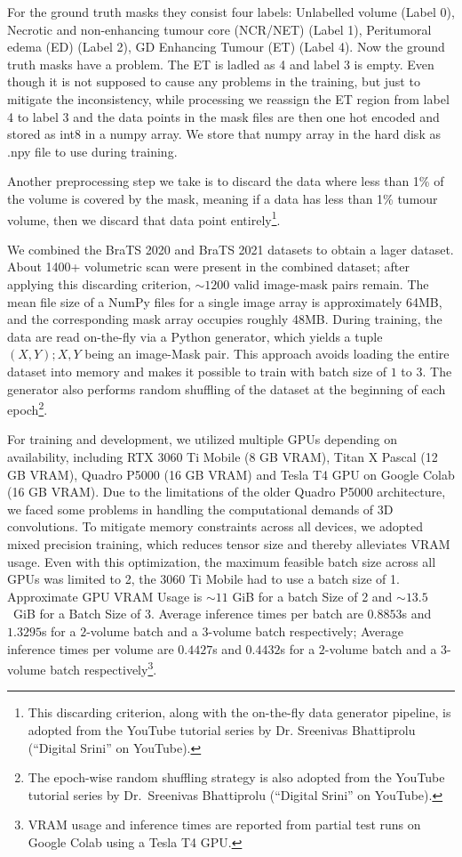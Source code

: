 \documentclass[a4paper,fleqn]{cas-dc}
\begin{document}
For the ground truth masks they consist four labels: Unlabelled volume (Label 0), Necrotic and non-enhancing tumour core (NCR/NET) (Label 1), Peritumoral edema (ED) (Label 2), GD Enhancing Tumour (ET) (Label 4). Now the ground truth masks have a problem. The ET is ladled as 4 and label 3 is empty. Even though it is not supposed to cause any problems in the training, but just to mitigate the inconsistency, while processing we reassign the ET region from label 4 to label 3 and the data points in the mask files are then one hot encoded and stored as int8 in a numpy array. We store that numpy array in the hard disk as .npy file to use during training.

Another preprocessing step we take is to discard the data where less than 1\% of the volume is covered by the mask, meaning if a data has less than 1\% tumour volume, then we discard that data point entirely\footnote{This discarding criterion, along with the on-the-fly data generator pipeline, is adopted from the YouTube tutorial series by Dr. Sreenivas Bhattiprolu (``Digital Srini'' on YouTube).}.

We combined the BraTS 2020 and BraTS 2021 datasets to obtain a lager dataset. About 1400+ volumetric scan were present in the combined dataset; after applying this discarding criterion, $\sim1200$ valid image-mask pairs remain. The mean file size of a NumPy files for a single image array is approximately 64MB, and the corresponding mask array occupies roughly 48MB. During training, the data are read on-the-fly via a Python generator, which yields a tuple $(X,Y); X,Y$ being an image-Mask pair. This approach avoids loading the entire dataset into memory and makes it possible to train with batch size of $1$ to $3$. The generator also performs random shuffling of the dataset at the beginning of each epoch\footnote{The epoch-wise random shuffling strategy is also adopted from the YouTube tutorial series by Dr.\ Sreenivas Bhattiprolu (``Digital Srini'' on YouTube).}.

{\sloppy
For training and development, we utilized multiple GPUs depending on availability, including RTX 3060 Ti Mobile (8 GB VRAM), Titan X Pascal (12 GB VRAM), Quadro P5000 (16 GB VRAM) and Tesla T4 GPU on Google Colab (16 GB VRAM). Due to the limitations of the older Quadro P5000 architecture, we faced some problems in handling the computational demands of 3D convolutions. To mitigate memory constraints across all devices, we adopted mixed precision training, which reduces tensor size and thereby alleviates VRAM usage. Even with this optimization, the maximum feasible batch size across all GPUs was limited to 2, the 3060 Ti Mobile had to use a batch size of 1. Approximate GPU VRAM Usage is $\sim11$ GiB for a batch Size of 2 and $\sim13.5$~GiB for a Batch Size of $3$. Average inference times per batch are $0.8853$s and $1.3295$s for a $2$-volume batch and a $3$-volume batch respectively; Average inference times per volume are $0.4427$s and $0.4432$s for a $2$-volume batch and a $3$-volume batch respectively\footnote{VRAM usage and inference times are reported from partial test runs on Google Colab using a Tesla T4 GPU.}.\par}
\end{document}
